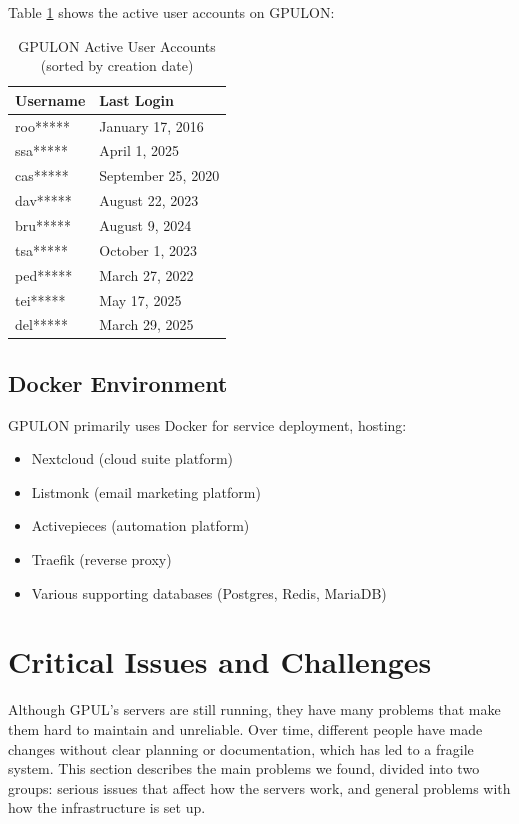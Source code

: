 Table \ref{tab:gpulon_users} shows the active user accounts on GPULON:

\begin{table}[H]
  \centering
  \caption{GPULON Active User Accounts (sorted by creation date)}
  \label{tab:gpulon_users}
  \begin{tabular}{ll}
    \rowcolor{udcpink!25}
    \textbf{Username} & \textbf{Last Login} \\
    \hline
    roo***** & January 17, 2016 \\
    ssa***** & April 1, 2025 \\
    cas***** & September 25, 2020 \\
    dav***** & August 22, 2023 \\
    bru***** & August 9, 2024 \\
    tsa***** & October 1, 2023 \\
    ped***** & March 27, 2022 \\
    tei***** & May 17, 2025 \\
    del***** & March 29, 2025 \\
  \end{tabular}
\end{table}

\subsection{Docker Environment}

GPULON primarily uses Docker for service deployment, hosting:
\begin{itemize}
  \item Nextcloud (cloud suite platform)
  \item Listmonk (email marketing platform)
  \item Activepieces (automation platform)
  \item Traefik (reverse proxy)
  \item Various supporting databases (Postgres, Redis, MariaDB)
\end{itemize}

\section{Critical Issues and Challenges}

Although GPUL's servers are still running, they have many problems that make them hard to maintain and unreliable. Over time, different people have made changes without clear planning or documentation, which has led to a fragile system. This section describes the main problems we found, divided into two groups: serious issues that affect how the servers work, and general problems with how the infrastructure is set up.

